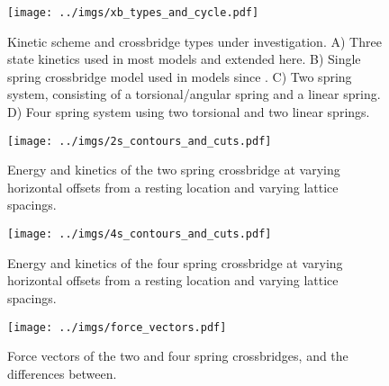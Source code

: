 \documentclass[]{article}
\begin{document}
\begin{figure}[p]
    \begin{center}
    \texttt{[image: ../imgs/xb\_types\_and\_cycle.pdf]}
    \label{fig:types}
    \caption{
        Kinetic scheme and crossbridge types under investigation. 
        A) Three state kinetics used in most models and extended here. 
        B) Single spring crossbridge model used in models since \cite{Huxley1957e}. 
        C) Two spring system, consisting of a torsional/angular spring and a linear spring. 
        D) Four spring system using two torsional and two linear springs.}
    \end{center}
\end{figure}

\begin{figure}[p]
    \begin{center}
    \texttt{[image: ../imgs/2s\_contours\_and\_cuts.pdf]}
    \label{fig:2s}
    \caption{
        Energy and kinetics of the two spring crossbridge at varying horizontal offsets from a resting location and varying lattice spacings.}
    \end{center}
\end{figure}

\begin{figure}[p]
    \begin{center}
    \texttt{[image: ../imgs/4s\_contours\_and\_cuts.pdf]}
    \label{fig:4s}
    \caption{
        Energy and kinetics of the four spring crossbridge at varying horizontal offsets from a resting location and varying lattice spacings.}
    \end{center}
\end{figure}

\begin{figure}[p]
    \begin{center}
    \texttt{[image: ../imgs/force\_vectors.pdf]}
    \label{fig:force}
    \caption{
        Force vectors of the two and four spring crossbridges, and the differences between.}
    \end{center}
\end{figure}





\end{document}
